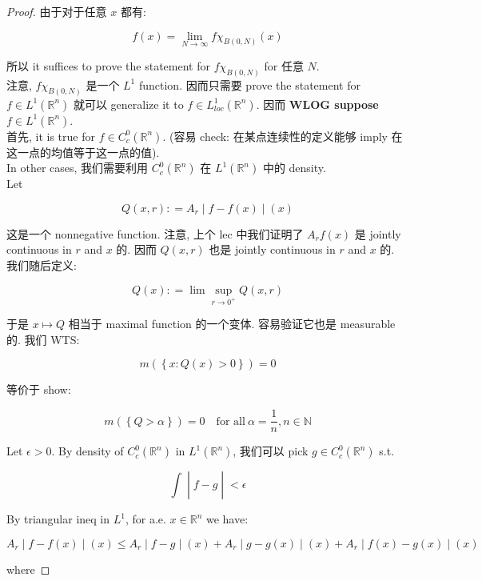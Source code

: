 \documentclass{qlnotes-export}
\begin{document}
\begin{proof}

由于对于任意 \(x\) 都有:

\[f(x) = \lim\limits_{N\rightarrow\infty}f\chi_{B(0,N)}(x)\]

所以 it suffices to prove the statement for \(f\chi_{B(0,N)}\) for 任意 \(N\).\\
注意, \(f\chi_{B(0,N)}\) 是一个 \(L^{1}\) function. 因而只需要 prove the statement for \(f \in L^{1}({\mathbb{R}}^{n})\) 就可以 generalize it to \(f \in L_{loc}^{1}({\mathbb{R}}^{n})\). 因而 \textbf{WLOG suppose \(f \in L^{1}({\mathbb{R}}^{n})\)}.\\
首先, it is true for \(f \in C_{c}^{0}({\mathbb{R}}^{n})\). (容易 check: 在某点连续性的定义能够 imply 在这一点的均值等于这一点的值).\\
In other cases, 我们需要利用 \(C_{c}^{0}({\mathbb{R}}^{n})\) 在 \(L^{1}({\mathbb{R}}^{n})\) 中的 density.\\
Let

\[\left. Q(x,r): = A_{r} \middle| f - f(x) \middle| (x) \right.\]

这是一个 nonnegative function. 注意, 上个 lec 中我们证明了 \(A_{r}f(x)\) 是 jointly continuous in \(r\) and \(x\) 的. 因而 \(Q(x,r)\) 也是 jointly continuous in \(r\) and \(x\) 的.\\
我们随后定义:

\[Q(x): = \lim\sup\limits_{r\rightarrow 0^{+}}Q(x,r)\]

于是 \(x\mapsto Q\) 相当于 maximal function 的一个变体. 容易验证它也是 measurable 的. 我们 WTS:

\[m(\left\{ {x:Q(x) > 0} \right\}) = 0\]

等价于 show:

\[m(\left\{ {Q > \alpha} \right\}) = 0\quad\text{for all}\ \alpha = \frac{1}{n}, n \in {\mathbb{N}}\]

Let \(\epsilon > 0\). By density of \(C_{c}^{0}({\mathbb{R}}^{n})\) in \(L^{1}({\mathbb{R}}^{n})\), 我们可以 pick \(g \in C_{c}^{0}({\mathbb{R}}^{n})\) s.t.

\[\left. \int \middle| f - g \middle| < \epsilon \right.\]

By triangular ineq in \(L^{1}\), for a.e. \(x \in {\mathbb{R}}^{n}\) we have:

\[\left. A_{r} \middle| f - f(x) \middle| (x) \leq A_{r} \middle| f - g \middle| (x) + A_{r} \middle| g - g(x) \middle| (x) + A_{r} \middle| f(x) - g(x) \middle| (x) \right.\]

where


\end{proof}
\end{document}
